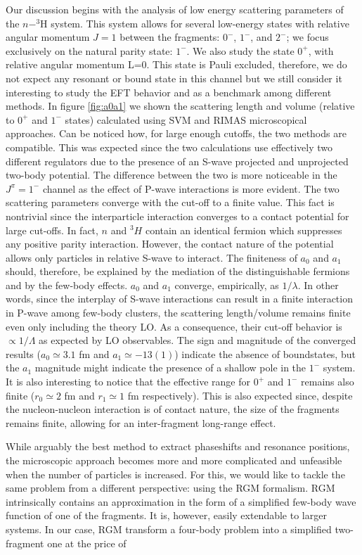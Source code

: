 \documentclass[aps,onecolumn,preprintnumbers,amsmath,amssymb,nofootinbib,superscriptaddress,notitlepage]{revtex4-1}
\begin{document}
Our discussion begins with the analysis of low energy scattering parameters of the $n-^3$H system. 
This system allows for several low-energy states with relative angular momentum $J=1$ between the fragments: $0^-$, $1^-$, and $2^-$; we focus exclusively on the natural parity state: $1^-$. 
We also study the state $0^+$, with relative angular momentum L=$0$. 
This state is Pauli excluded, therefore, we do not expect any resonant or bound state in this channel but we still consider it interesting to study the EFT behavior and as a benchmark among different methods.
In figure \ref{fig:a0a1} we shown the scattering length and volume (relative to $0^+$ and $1^-$ states) calculated using SVM and RIMAS microscopical approaches.
Can be noticed how, for large enough cutoffs, the two methods are compatible.
This was expected since the two calculations use effectively two different regulators due to the presence of an S-wave projected and unprojected two-body potential. 
The difference between the two is more noticeable in the $J^\pi=1^-$ channel as the effect of P-wave interactions is more evident.
The two scattering parameters converge with the cut-off to a finite value. 
This fact is nontrivial since the interparticle interaction converges to a contact potential for large cut-offs.
In fact, $n$ and $^3H$ contain an identical fermion which suppresses any positive parity interaction.
However, the contact nature of the potential allows only particles in relative S-wave to interact. 
The finiteness of $a_0$ and $a_1$ should, therefore, be explained by the mediation of the distinguishable fermions and by the few-body effects.
$a_0$ and $a_1$ converge, empirically, as $1/\lambda$. 
In other words, since the interplay of S-wave interactions can result in a finite interaction in P-wave among few-body clusters, the scattering length/volume remains finite even only including the theory LO.
As a consequence, their cut-off behavior is $\propto1/\Lambda$ as expected by LO observables.
The sign and magnitude of the converged results ($a_0\simeq 3.1$ fm and $a_1\simeq-13(1)$) indicate the absence of boundstates, but the $a_1$ magnitude might indicate the presence of a shallow pole in the $1^-$ system.
It is also interesting to notice that the effective range for $0^+$ and $1^-$ remains also finite ($r_0\simeq2$ fm and $r_1\simeq1$ fm respectively).
This is also expected since, despite the nucleon-nucleon interaction is of contact nature, the size of the fragments remains finite, allowing for an inter-fragment long-range effect.
%

While arguably the best method to extract phaseshifts and resonance positions, the microscopic approach becomes more and more complicated and unfeasible when the number of particles is increased. 
For this, we would like to tackle the same problem from a different perspective: using the RGM formalism.
RGM intrinsically contains an approximation in the form of a simplified few-body wave function of one of the fragments.
It is, however, easily extendable to larger systems.
In our case, RGM transform a four-body problem into a simplified two-fragment one at the price of 
\end{document}
